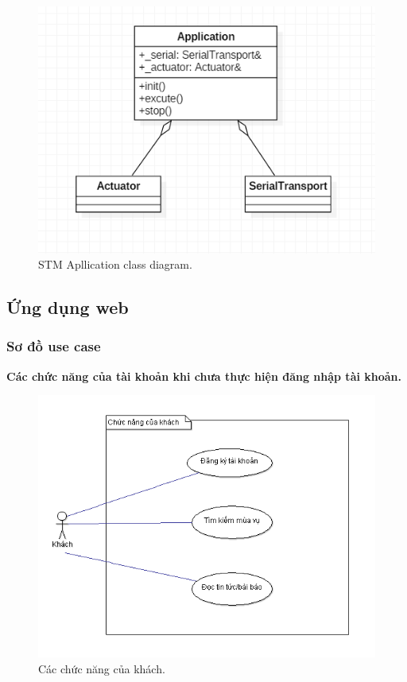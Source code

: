 \documentclass[a4paper,12pt,oneside]{article}
\begin{document}
\begin{figure}[H]
\centering
\begin{center}
\includegraphics[scale=.8]{hinh/class_stmapplication.PNG}
\end{center}
\caption{STM Apllication class diagram.}
\end{figure}

\newpage
\subsection{Ứng dụng web}
\subsubsection{Sơ đồ use case}
\indent \textbf{Các chức năng của tài khoản khi chưa thực hiện đăng nhập tài khoản.}\\

\begin{figure}[htp]
\centering
\includegraphics[scale=.9]{hinh/uc_web1.png}
\caption{Các chức năng của khách.}
\end{figure}
\end{document}
